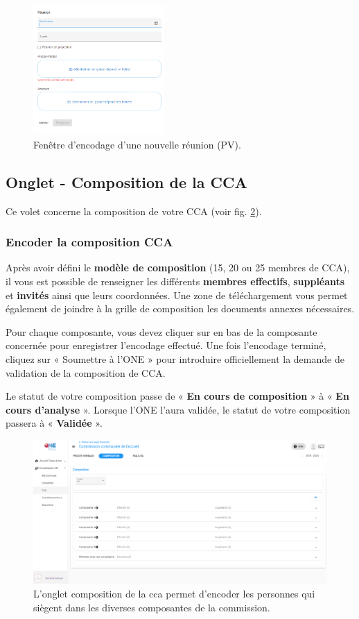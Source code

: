\begin{figure}[htbp]
    \centering
    \includegraphics[width=5cm,frame]{Images/catl/cca-pv-new.png}
    \caption{Fenêtre d'encodage d'une nouvelle réunion (PV). }
    \label{fig:cca-pv-new}
\end{figure}



\subsection{Onglet - Composition de la CCA}
Ce volet concerne la composition de votre CCA (voir fig. \ref{fig:cca_compo}). 

\subsubsection{Encoder la composition CCA}
Après avoir défini le \textbf{modèle de composition} (15, 20 ou 25 membres de CCA), il vous est possible de renseigner les différents \textbf{membres effectifs}, \textbf{suppléants} et \textbf{invités} ainsi que leurs coordonnées.  Une zone de téléchargement vous permet également de joindre à la grille de composition les documents annexes nécessaires. 

Pour chaque composante, vous devez cliquer sur  en bas de la composante concernée pour enregistrer l’encodage effectué. Une fois l’encodage terminé, cliquez sur « Soumettre à l’ONE » pour introduire officiellement la demande de validation de la composition de CCA. 

Le statut de votre composition passe de « \textbf{En cours de composition} » à « \textbf{En cours d’analyse} ». Lorsque l’ONE l’aura validée, le statut de votre composition passera à « \textbf{Validée} ».  

\begin{figure}[htbp]
    \centering
    \includegraphics[width=12cm,frame]{Images/catl/cca-compo.png}
    \caption{L'onglet composition de la cca permet d'encoder les personnes qui siègent dans les diverses composantes de la commission.}
    \label{fig:cca_compo}
\end{figure}



